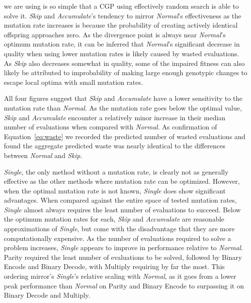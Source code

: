 \documentclass[runningheads,a4paper]{llncs}
\begin{document}
we are using is so simple that a CGP using effectively random search is able to solve it.
\emph{Skip} and \emph{Accumulate}'s tendency to mirror \emph{Normal}'s effectiveness as the
mutation rate increases is because the probability of creating actively identical offspring
approaches zero.  As the divergence point is always near
\emph{Normal}'s optimum mutation rate, it can be inferred that \emph{Normal}'s significant decrease in
quality when using lower mutation rates is likely caused by wasted evaluations.
As \emph{Skip} also decreases
somewhat in quality, some of the impaired fitness can also likely be attributed
to improbability of making large enough genotypic changes to escape local optima
with small mutation rates.

All four figures suggest that \emph{Skip} and \emph{Accumulate}
have a lower sensitivity to the mutation rate than \emph{Normal}.
As the mutation rate goes below the optimal value,
\emph{Skip} and \emph{Accumulate} encounter a relatively minor increase in their median number of evaluations
when compared with \emph{Normal}. As confirmation of Equation~\ref{eq:waste}
we recorded the predicted number of wasted evaluations and found
the aggregate predicted waste was nearly identical to the differences between \emph{Normal} and \emph{Skip}.

\emph{Single}, the only method without a mutation rate, is clearly not as generally effective as
the other methods where mutation rate can be optimized.  However, when the optimal mutation rate is
not known, \emph{Single} does show significant advantages.  When compared against the entire
space of tested mutation rates, \emph{Single} almost always requires
the least number of evaluations to succeed.  Below the optimum mutation rates for each, \emph{Skip}
and \emph{Accumulate} are reasonable approximations of \emph{Single}, but come with the disadvantage
that they are more computationally expensive.
%
As the number of evaluations required to solve a problem increases, \emph{Single}
appears to improve in performance relative to \emph{Normal}.  Parity required the
least number of evaluations to be solved, followed by Binary Encode and Binary Decode,
with Multiply requiring by far the most.
This ordering mirror's \emph{Single}'s relative scaling with \emph{Normal}, 
as it goes from a lower peak performance than \emph{Normal}
on Parity and Binary Encode to surpassing it on Binary Decode and Multiply.
\end{document}
